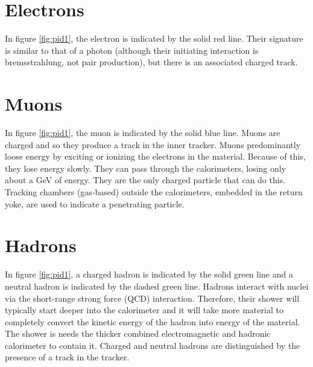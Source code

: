 \section{Electrons}
In figure \ref{fig:pid1}, the electron is indicated by the solid red line.  Their signature is similar to that of a photon (although their initiating interaction is bremsstrahlung, not pair production), but there is an associated charged track.
\section{Muons}
In figure \ref{fig:pid1}, the muon is indicated by the solid blue line. Muons are charged and so they produce a track in the inner tracker. Muons predominantly loose energy by exciting or ionizing the electrons in the material.  Because of this, they lose energy slowly. They can pass through the calorimeters, losing only about a GeV of energy.  They are the only charged particle that can do this.  Tracking chambers (gas-based) outside the calorimeters, embedded in the return yoke, are used to indicate a penetrating particle.
\section{Hadrons}
In figure \ref{fig:pid1}, a charged hadron is indicated by the solid green line and a neutral hadron is indicated by the dashed green line. Hadrons interact with nuclei via the short-range strong force (QCD) interaction. Therefore, their shower will typically start deeper into the calorimeter and it will take more material to completely convert the kinetic energy of the hadron into energy of the material. The shower is needs the thicker combined electromagnetic and hadronic calorimeter to contain it. Charged and neutral hadrons are distinguished by the presence of a track in the tracker.
